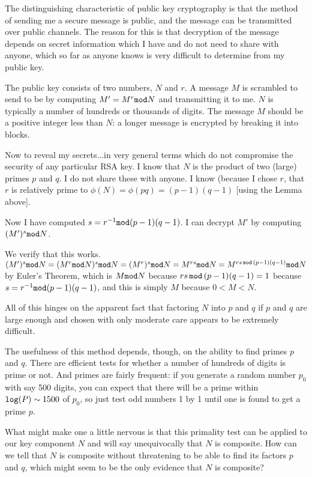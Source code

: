 \documentclass[12pt]{article}
\begin{document}
The distinguishing characteristic of public key cryptography is that the method of sending me a secure message is public, and the message can be transmitted over public channels.  The reason for this is that decryption of the message depends on secret information which I have and do not need to share with anyone, which so far as anyone knows is very difficult to determine from my public key.

The public key consists of two numbers, $N$ and $r$.  A message $M$ is scrambled to send to be by computing
$M' = M^r {\tt mod}N$ and transmitting it to me.  $N$ is typically a number of hundreds or thousands of digits.  The message $M$ should be a positive integer less than $N$:  a longer message is encrypted by breaking it into blocks.

Now to reveal my secrets...in very general terms which do not compromise the security of any particular RSA key.  I know that $N$ is the product of two (large) primes $p$ and $q$.  I do not share these with anyone.  I know (because I chose $r$, that $r$ is relatively prime to $\phi(N) = \phi(pq) = (p-1)(q-1)$ [using the Lemma above].

Now I have computed $s = r^{-1} {\tt mod} (p-1)(q-1)$.  I can decrypt $M'$ by computing $(M')^s {\tt mod} N$.

We verify that this works.  $(M')^s {\tt mod}N = (M^r {\tt mod} N)^s {\tt mod} N = (M^r)^s {\tt mod} N = M^{rs} {\tt mod} N = M^{rs \,{\tt mod}\, (p-1)(q-1)} {\tt mod} N$ by Euler's Theorem, which is $M {\tt mod} N$ because $rs \, {\tt mod}\, (p-1)(q-1)= 1$ because  $s = r^{-1} {\tt mod} (p-1)(q-1)$, and this is simply $M$ because $0<M<N$.


All of this hinges  on the apparent fact that factoring $N$ into $p$ and $q$ if $p$ and $q$ are large enough and chosen with only moderate care appears to be extremely difficult.

The usefulness of this method depends, though, on the ability to find primes $p$ and $q$.  There are efficient tests for whether a number of hundreds of digits is prime or not.  And primes are fairly frequent:  if you generate a random number $p_0$ with say 500 digits, you can expect that there will be a prime within ${\tt log}(P) \sim 1500$ of $p_0$, so just test odd numbers 1 by 1 until one is found to get a prime $p$.

What might make one a little nervous is that this primality test can be applied to our key component $N$ and will say unequivocally that $N$ is composite.  How can we tell that $N$ is composite without threatening to be able to find its factors $p$ and $q$, which might seem to be the only evidence that $N$ is composite?
\end{document}
